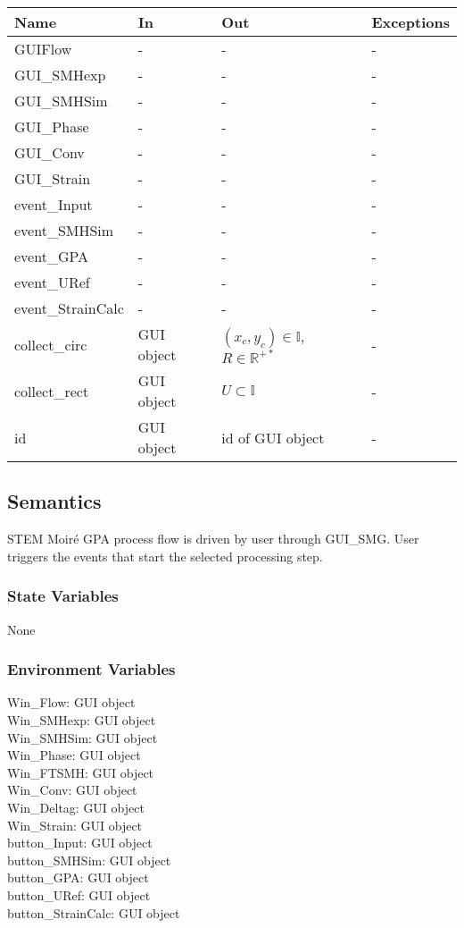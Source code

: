\documentclass[12pt, titlepage]{article}
\newcommand{\progname}{STEM Moir{\'e} GPA}
\begin{document}
\begin{center}
\begin{tabular}{p{4cm} p{3cm} p{3cm} p{3cm}}
\hline
\textbf{Name} & \textbf{In} & \textbf{Out} & \textbf{Exceptions} \\
\hline
GUIFlow & - & - & - \\
GUI{\_}SMHexp & - & - & - \\
GUI{\_}SMHSim & - & - & - \\
GUI{\_}Phase & - & - & - \\
GUI{\_}Conv & - & - & - \\
GUI{\_}Strain & - & - & - \\
event{\_}Input & - & - & - \\
event{\_}SMHSim & - & - & - \\
event{\_}GPA & - & - & - \\
event{\_}URef & - & - & - \\
event{\_}StrainCalc & - & - & - \\
collect{\_}circ & GUI object & $(x_c,y_c)\in\mathbb{I}$,$R \in\mathbb{R}^{+*}$ & 
- \\
collect{\_}rect & GUI object & $U \subset \mathbb{I}$ & -\\
id & GUI object & id of GUI object & - \\
\hline
\end{tabular}
\end{center}

\subsection{Semantics}

\progname{} process flow is driven by user through GUI{\_}SMG. User triggers the 
events that start the selected processing step. 

\subsubsection{State Variables}
None

\subsubsection{Environment Variables}

\noindent Win{\_}Flow: GUI object\\
Win{\_}SMHexp: GUI object\\
Win{\_}SMHSim: GUI object\\
Win{\_}Phase: GUI object\\
Win{\_}FTSMH: GUI object\\
Win{\_}Conv: GUI object\\
Win{\_}Deltag: GUI object\\
Win{\_}Strain: GUI object\\
button{\_}Input: GUI object\\
button{\_}SMHSim: GUI object\\
button{\_}GPA: GUI object\\
button{\_}URef: GUI object\\
button{\_}StrainCalc: GUI object\\
\end{document}
